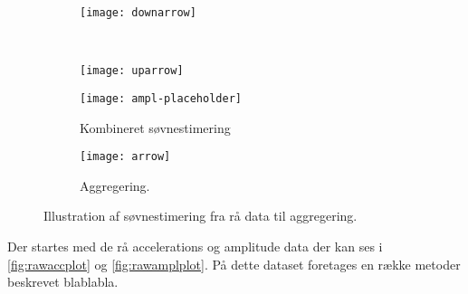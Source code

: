 \begin{sidewaysfigure}
\begin{minipage}{0.1\textwidth}
		\begin{subfigure}{\linewidth}
			\centering
			\texttt{[image: downarrow]}
		\end{subfigure}\\[15ex]
		\begin{subfigure}{\linewidth}
			\centering
			\texttt{[image: uparrow]}
		\end{subfigure}
	\end{minipage}%
	\begin{minipage}{0.2\textwidth}
		\begin{subfigure}{\linewidth}
			\centering
			\texttt{[image: ampl-placeholder]}
			\caption{Kombineret søvnestimering}\label{fig:sleepcalcombine}
		\end{subfigure}
	\end{minipage}%
	\begin{minipage}{0.1\textwidth}
		\begin{subfigure}{\linewidth}
			\centering
			\texttt{[image: arrow]}
		\end{subfigure}
	\end{minipage}%
	\begin{minipage}{0.07\textwidth}
		\begin{subfigure}{\linewidth}
			\centering
			\caption{Aggregering.}\label{fig:finalagg}
		\end{subfigure}
	\end{minipage}
	\caption{Illustration af søvnestimering fra rå data til aggregering.}\label{fig:totalbanjo}
\end{sidewaysfigure}

Der startes med de rå accelerations og amplitude data der kan ses i \cref{fig:rawaccplot} og \cref{fig:rawamplplot}.
På dette dataset foretages en række metoder beskrevet blablabla.